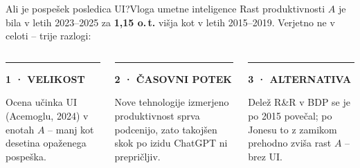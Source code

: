 \documentclass[aspectratio=169,10pt]{beamer}
\makeatletter
\newcommand{\vir}[1]{\gdef\vir@besedilo{#1}}
\gdef\vir@besedilo{}
\newcommand{\kartica}[2]{%
  {\color{accent}\rule{\linewidth}{1pt}}\par\vspace{1.5mm}%
  {\bfseries\normalsize #1}\par\vspace{1mm}%
  {\color{body}\small #2}}
\newcommand{\oznaka}[1]{{\color{accent}\scriptsize\bfseries\MakeUppercase{#1}}}
\makeatother
\begin{document}
\begin{frame}{Ali je pospešek posledica UI?}{Vloga umetne inteligence}
\vir{Viri: Acemoglu (2024, str. 29); Brynjolfsson in sod. (2018, str. 3); Jones (1995); NSB (2025); lastni izračun}
{\color{body}Rast produktivnosti $A$ je bila v letih 2023--2025 za \textbf{1,15 o.\,t.} višja kot v letih 2015--2019. Verjetno ne v celoti -- trije razlogi:}
\par\vspace{5mm}
\begin{columns}[T,onlytextwidth]
\begin{column}{0.31\textwidth}\kartica{\oznaka{1 · Velikost}\par\vspace{1mm}{\color{hl}\LARGE 0,1 o.\,t.}}{Ocena učinka UI (Acemoglu, 2024) v enotah $A$ -- manj kot desetina opaženega pospeška.}\end{column}
\begin{column}{0.31\textwidth}\kartica{\oznaka{2 · Časovni potek}\par\vspace{1mm}{\color{hl}\LARGE J-krivulja}}{Nove tehnologije izmerjeno produktivnost sprva podcenijo, zato takojšen skok po izidu ChatGPT ni prepričljiv.}\end{column}
\begin{column}{0.31\textwidth}\kartica{\oznaka{3 · Alternativa}\par\vspace{1mm}{\color{hl}\LARGE +0,67 o.\,t.}}{Delež R\&R v BDP se je po 2015 povečal; po Jonesu to z zamikom prehodno zviša rast $A$ -- brez UI.}\end{column}
\end{columns}
\end{frame}
\end{document}
